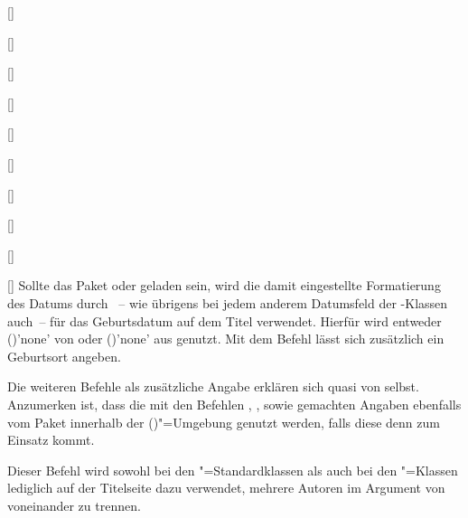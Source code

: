 \begin{Declaration*}{}
\begin{Declaration*}{}
\begin{Declaration*}{}
\begin{Declaration}{[]}
\begin{Declaration}{[]}
\begin{Declaration}{%
  []%
}
\begin{Declaration}{[]}
\begin{Declaration}{[]}
\begin{Declaration}{[]}
\begin{Declaration}{[]}
\begin{Declaration}{[]}
\begin{Declaration}{[]}
\begin{Declaration}{[]}
Sollte das Paket  oder  geladen sein, wird 
die damit eingestellte Formatierung des Datums durch ~-- wie 
übrigens bei jedem anderem Datumsfeld der \TUDScript-Klassen auch~-- für das 
Geburtsdatum auf dem Titel verwendet. Hierfür wird entweder  
()'none' von  oder 
()'none' aus  genutzt. Mit 
dem Befehl  lässt sich zusätzlich ein Geburtsort angeben.

Die weiteren Befehle als zusätzliche Angabe erklären sich quasi von selbst. 
Anzumerken ist, dass die mit den Befehlen ,  
,  sowie  gemachten 
Angaben ebenfalls vom Paket  innerhalb der 
()"=Umgebung genutzt werden, falls 
diese denn zum Einsatz kommt.
\end{Declaration}
\end{Declaration}
\end{Declaration}
\end{Declaration}
\end{Declaration}
\end{Declaration}
\end{Declaration}
\end{Declaration}
\end{Declaration}
\end{Declaration}

\begin{Declaration}{}
\printdeclarationlist%
%
%
Dieser Befehl wird sowohl bei den "=Standardklassen als auch bei 
den \KOMAScript"=Klassen lediglich auf der Titelseite dazu verwendet, mehrere 
Autoren im Argument von  voneinander zu trennen.


\end{Declaration}
\end{Declaration*}
\end{Declaration*}
\end{Declaration*}
